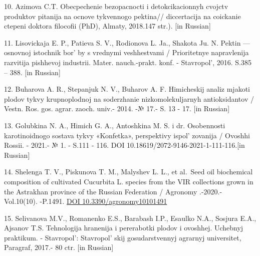 \begin{references}
10. Azimova C.T. Obecpechenie bezopacnocti i detokcikacionnyh cvojctv
produktov pitanija na ocnove tykvennogo pektina// diccertacija na
coickanie ctepeni doktora filocofii (PhD), Almaty, 2018.147 str.).
{[}in Russian{]}

11. Lisovickaja E. P., Patieva S. V., Rodionova L. Ja., Shakota Ju. N.
Pektin --- osnovnoj istochnik bor' by s vrednymi
veshhestvami / Prioritetnye napravlenija razvitija pishhevoj industrii.
Mater. nauch.-prakt. konf. - Stavropol', 2016. S.385 --
388. {[}in Russian{]}

12. Buharova A. R., Stepanjuk N. V., Buharov A. F. Himicheskij analiz
mjakoti plodov tykvy krupnoplod\-noj na soderzhanie nizkomolekuljarnyh
antioksidantov / Vestn. Ros. gos. agrar. zaoch. univ.- 2014. -№ 17.- S.
13 - 17. {[}in Russian{]}

13. Golubkina N. A., Himich G. A., Antoshkina M. S. i dr. Osobennosti
karotinoidnogo sostava tykvy «Konfetka», perspektivy
ispol' zovanija / Ovoshhi Rossii. - 2021.- № 1. - S.111
- 116. DOI 10.18619/2072-9146-2021-1-111-116.{[}in Russian{]}

14. Shelenga T. V., Piskunova T. M., Malyshev L. L., et al.~Seed oil
biochemical composition of cultivated Cucurbita L. species from the VIR
collections grown in the Astrakhan province of the Russian
Federation / Agronomy .-2020.- Vol.10(10). -P.1491.
\href{https://doi.org/10.3390/agronomy10101491}{DOI
10.3390/agronomy10101491}

15. Selivanova M.V., Romanenko E.S., Barabash I.P., Esaulko N.A.,
Sosjura E.A., Ajsanov T.S. Tehnolog\-ija hranenija i pererabotki plodov i
ovoshhej. Uchebnyj praktikum. - Stavropol':
Stavropol' skij gosudarstv\-ennyj agrarnyj universitet,
Paragraf, 2017.- 80 ctr. {[}in Russian{]}
\end{references}

